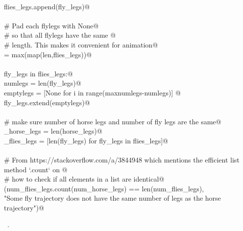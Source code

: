 \documentclass[11.5pt]{report}
\begin{document}
\begin{flushleft}
\begin{minipage}{\linewidth}
\begin{list}{}{}
\mbox{}\verb@@\\
\mbox{}\verb@    flies_legs.append(fly_legs)@\\
\mbox{}\verb@@\\
\mbox{}\verb@# Pad each flylegs with None@\\
\mbox{}\verb@# so that all flylegs have the same @\\
\mbox{}\verb@# length. This makes it convenient for animation@\\
\mbox{}\verb@maxnumlegs = max(map(len,flies_legs))@\\
\mbox{}\verb@@\\
\mbox{}\verb@for fly_legs in flies_legs:@\\
\mbox{}\verb@    numlegs   = len(fly_legs)@\\
\mbox{}\verb@    emptylegs = [None for i in range(maxnumlegs-numlegs)] @\\
\mbox{}\verb@    fly_legs.extend(emptylegs)@\\
\mbox{}\verb@@\\
\mbox{}\verb@# make sure number of horse legs and number of fly legs are the same@\\
\mbox{}\verb@num_horse_legs = len(horse_legs)@\\
\mbox{}\verb@num_flies_legs = [len(fly_legs) for fly_legs in flies_legs]@\\
\mbox{}\verb@@\\
\mbox{}\verb@# From https://stackoverflow.com/a/3844948 which mentions the efficient list method `.count` on @\\
\mbox{}\verb@# how to check if all elements in a list are identical@\\
\mbox{}\verb@assert(num_flies_legs.count(num_horse_legs) == len(num_flies_legs), \@\\
\mbox{}\verb@       "Some fly trajectory does not have the same number of legs as the horse trajectory")@\\
\mbox{}\verb@@{\NWsep}
\end{list}
\vspace{-1.5ex}
\footnotesize
\begin{list}{}{\setlength{\itemsep}{-\parsep}\setlength{\itemindent}{-\leftmargin}}
\item \NWtxtMacroRefIn\ .

\item{}
\end{list}
\end{minipage}\vspace{4ex}
\end{flushleft}
\end{document}
